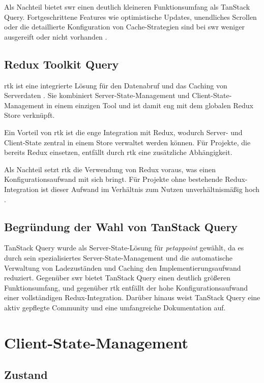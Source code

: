 Als Nachteil bietet \gls{swr} einen deutlich kleineren Funktionsumfang als TanStack Query. Fortgeschrittene Features wie optimistische Updates, unendliches Scrollen oder die detaillierte Konfiguration von Cache-Strategien sind bei \gls{swr} weniger ausgereift oder nicht vorhanden
\cite{swr-docs}.

\subsection{Redux Toolkit Query}

\gls{rtk} ist eine integrierte Lösung für den Datenabruf und das Caching von Serverdaten \cite{redux-toolkit-docs}. Sie kombiniert Server-State-Management und Client-State-Management in einem einzigen Tool und ist damit eng mit dem globalen Redux Store
verknüpft.

Ein Vorteil von \gls{rtk} ist die enge Integration mit Redux, wodurch Server- und Client-State zentral in einem Store verwaltet werden können. Für Projekte, die bereits Redux einsetzen, entfällt durch \gls{rtk}
eine zusätzliche Abhängigkeit.

Als Nachteil setzt \gls{rtk} die Verwendung von Redux voraus, was einen Konfigurationsaufwand mit sich bringt. Für Projekte ohne bestehende Redux-Integration ist dieser Aufwand im Verhältnis zum Nutzen unverhältnismäßig hoch \cite{redux-toolkit-docs}.

\subsection{Begründung der Wahl von TanStack Query}

TanStack Query wurde als Server-State-Lösung für \textit{petappoint} gewählt, da es durch sein spezialisiertes Server-State-Management und die automatische Verwaltung von Ladezuständen und Caching den Implementierungsaufwand reduziert. Gegenüber \gls{swr} bietet TanStack Query einen deutlich größeren Funktionsumfang, und gegenüber \gls{rtk} entfällt der hohe Konfigurationsaufwand einer vollständigen Redux-Integration. Darüber hinaus weist TanStack Query eine aktiv gepflegte Community und eine umfangreiche Dokumentation auf.

\section{Client-State-Management}

\subsection{Zustand}

